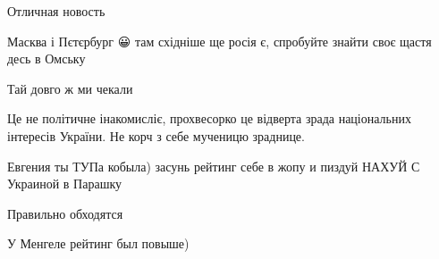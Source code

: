 \begin{itemize}
 
Отличная новость

 
Масква і Пєтєрбург 😀 там східніше ще росія є, спробуйте знайти своє щастя десь в Омську

 
Тай довго ж ми чекали🥳🥳🥳🥳🎇🎆🎇🎆🎇🎊🎉🎊🎉🎈🎈🎈

 
Це не політичне інакомисліє, прохвесорко це відверта зрада національних інтересів України. Не корч з себе мученицю зраднице.

 
Евгения ты ТУПа кобыла) засунь рейтинг себе в жопу и пиздуй НАХУЙ С Украиной в Парашку 💩💩💩💩💩

 
Правильно обходятся

 
У Менгеле рейтинг был повыше)


\end{itemize}
